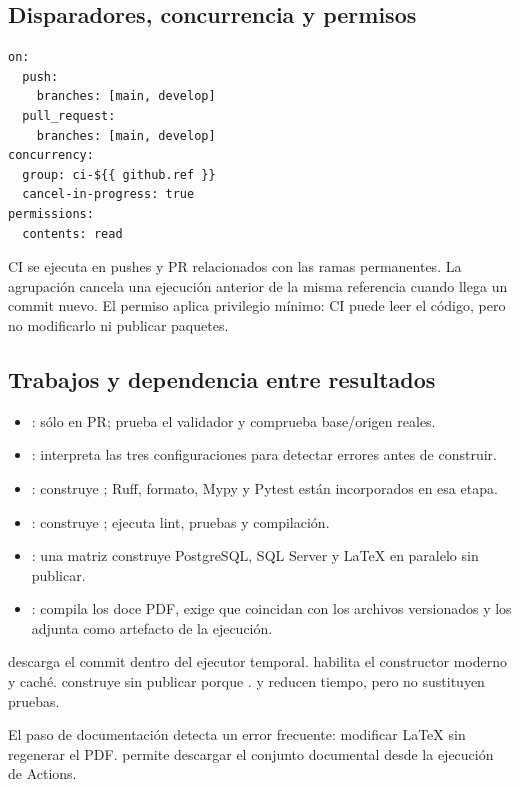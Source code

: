 \subsection{Disparadores, concurrencia y permisos}

\begin{lstlisting}[style=terminal]
on:
  push:
    branches: [main, develop]
  pull_request:
    branches: [main, develop]
concurrency:
  group: ci-${{ github.ref }}
  cancel-in-progress: true
permissions:
  contents: read
\end{lstlisting}

CI se ejecuta en pushes y PR relacionados con las ramas permanentes. La agrupación cancela una ejecución anterior de la misma referencia cuando llega un commit nuevo. El permiso  aplica privilegio mínimo: CI puede leer el código, pero no modificarlo ni publicar paquetes.

\subsection{Trabajos y dependencia entre resultados}

\begin{itemize}
  \item {}: sólo en PR; prueba el validador y comprueba base/origen reales.
  \item {}: interpreta las tres configuraciones para detectar errores antes de construir.
  \item {}: construye ; Ruff, formato, Mypy y Pytest están incorporados en esa etapa.
  \item {}: construye ; ejecuta lint, pruebas y compilación.
  \item {}: una matriz construye PostgreSQL, SQL Server y LaTeX en paralelo sin publicar.
  \item {}: compila los doce PDF, exige que coincidan con los archivos versionados y los adjunta como artefacto de la ejecución.
\end{itemize}

 descarga el commit dentro del ejecutor temporal.  habilita el constructor moderno y caché.  construye sin publicar porque .  y  reducen tiempo, pero no sustituyen pruebas.

El paso  de documentación detecta un error frecuente: modificar LaTeX sin regenerar el PDF.  permite descargar el conjunto documental desde la ejecución de Actions.

